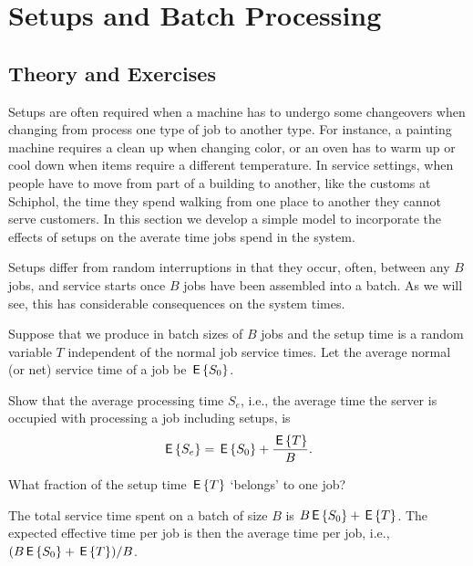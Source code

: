 \section{Setups and Batch Processing}
\label{sec:setups-batch-proc}

\subsection*{Theory and Exercises}


Setups are often required when a machine has to undergo some changeovers when changing from process one type of job to  another type. For instance, a painting machine requires a clean up when changing color, or an oven has to warm up or cool down when items require a different temperature. In service settings, when people have to move from part of a building to another, like the customs at Schiphol, the time they spend walking from one place to another they  cannot serve customers.  In this section we develop a simple model to incorporate the effects  of setups on the averate time jobs spend in the system.

Setups differ from random interruptions in that they occur, often, between any $B$ jobs, and service starts once $B$ jobs have been assembled into a batch. As we will see, this has considerable consequences on the system times. 

Suppose that we produce in batch sizes of $B$ jobs and the setup time is a random variable $T$ independent of the normal job service times. Let the average normal (or net) service time of a job be $\,\mathsf{E}\left\{S_0\right\}$. 
\begin{exercise}
  Show that the average  processing time $S_e$, i.e., the average time the server is occupied with processing a job including setups, is 
  \begin{equation*}
    \,\mathsf{E}\left\{S_e\right\} = \,\mathsf{E}\left\{S_0\right\} + \frac{\,\mathsf{E}\left\{T\right\}} B.
  \end{equation*}
  \begin{hint}
    What fraction of the setup time $\,\mathsf{E}\left\{T\right\}$ `belongs' to one job?
  \end{hint}
  \begin{solution}
    The total service time spent on a batch of size $B$ is $B \,\mathsf{E}\left\{S_0\right\} + \,\mathsf{E}\left\{T\right\}$. The expected effective time per job is then the average time per job, i.e.,  $(B \,\mathsf{E}\left\{S_0\right\}+\,\mathsf{E}\left\{T\right\})/B$. 
  \end{solution}
\end{exercise}

